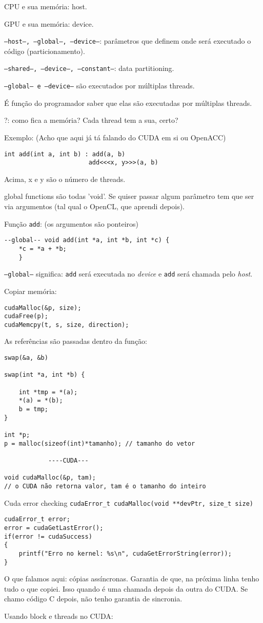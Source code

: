 \documentclass[12pt]{report} %
\begin{document}
CPU e sua memória: host.

GPU e sua memória: device.

\texttt{--host--, --global--, --device--}: parâmetros que definem onde será executado o código (particionamento).

\texttt{--shared--, --device--, --constant--}: data partitioning.

\texttt{--global-- e --device--} são executados por múltiplas threads.

É função do programador saber que elas são executadas por múltiplas threads.

?: como fica a memória? Cada thread tem a sua, certo?

Exemplo: (Acho que aqui já tá falando do CUDA em si ou OpenACC)

\begin{verbatim}
int add(int a, int b) : add(a, b)
					   add<<<x, y>>>(a, b)
\end{verbatim}
Acima, x e y são o número de threads.

global functions são todas 'void'. Se quiser passar algum parâmetro tem que 
ser via argumentos (tal qual o OpenCL, que aprendi depois).

Função \texttt{add}: (os argumentos são ponteiros)
\begin{verbatim}
--global-- void add(int *a, int *b, int *c) {
	*c = *a + *b;
	}
\end{verbatim}

\texttt{--global--} significa: \texttt{add} será executada no \textit{device} e 
\texttt{add} será chamada pelo \textit{host}.

Copiar memória:
\begin{verbatim}
cudaMalloc(&p, size);
cudaFree(p);
cudaMemcpy(t, s, size, direction);
\end{verbatim}

As referências são passadas dentro da função:

\begin{verbatim}
swap(&a, &b)

swap(int *a, int *b) {
	
	int *tmp = *(a);
	*(a) = *(b);
	b = tmp;
}

int *p;
p = malloc(sizeof(int)*tamanho); // tamanho do vetor

            ----CUDA---
            
void cudaMalloc(&p, tam); 
// o CUDA não retorna valor, tam é o tamanho do inteiro
\end{verbatim}

Cuda error checking \texttt{cudaError\_t cudaMalloc(void **devPtr, size\_t size)}

\begin{verbatim}
cudaError_t error;
error = cudaGetLastError();
if(error != cudaSuccess)
{
	printf("Erro no kernel: %s\n", cudaGetErrorString(error));
}
\end{verbatim}

O que falamos aqui: cópias assíncronas. Garantia de que, na próxima linha tenho tudo o que copiei. Isso quando é uma chamada depois da outra do CUDA. Se chamo 
código C depois, não tenho garantia de sincronia.

Usando block e threads no CUDA:
\end{document}
